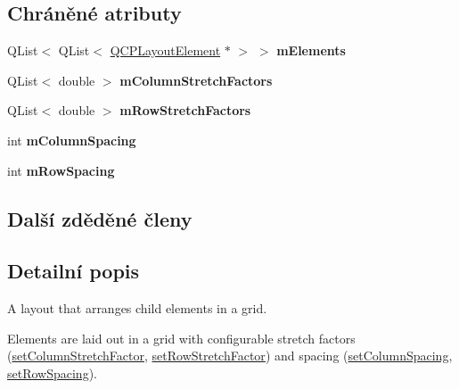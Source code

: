 \subsection*{Chráněné atributy}
\begin{DoxyCompactItemize}
\item 
\hypertarget{classQCPLayoutGrid_a3577d3855bf8ad20ef9079291a49f397}{}Q\+List$<$ Q\+List$<$ \hyperlink{classQCPLayoutElement}{Q\+C\+P\+Layout\+Element} $\ast$ $>$ $>$ {\bfseries m\+Elements}\label{classQCPLayoutGrid_a3577d3855bf8ad20ef9079291a49f397}

\item 
\hypertarget{classQCPLayoutGrid_ac6aabe62339f94f18b9f8adab94b1840}{}Q\+List$<$ double $>$ {\bfseries m\+Column\+Stretch\+Factors}\label{classQCPLayoutGrid_ac6aabe62339f94f18b9f8adab94b1840}

\item 
\hypertarget{classQCPLayoutGrid_a36c85a7eaf342680fb9b8a4977486f16}{}Q\+List$<$ double $>$ {\bfseries m\+Row\+Stretch\+Factors}\label{classQCPLayoutGrid_a36c85a7eaf342680fb9b8a4977486f16}

\item 
\hypertarget{classQCPLayoutGrid_ae9ac48f0791be07ead0a96dbd5622770}{}int {\bfseries m\+Column\+Spacing}\label{classQCPLayoutGrid_ae9ac48f0791be07ead0a96dbd5622770}

\item 
\hypertarget{classQCPLayoutGrid_a8b67f183f4645739cc4c794d75843b40}{}int {\bfseries m\+Row\+Spacing}\label{classQCPLayoutGrid_a8b67f183f4645739cc4c794d75843b40}

\end{DoxyCompactItemize}
\subsection*{Další zděděné členy}


\subsection{Detailní popis}
A layout that arranges child elements in a grid. 

Elements are laid out in a grid with configurable stretch factors (\hyperlink{classQCPLayoutGrid_ae38f31a71687b9d7ee3104852528fb50}{set\+Column\+Stretch\+Factor}, \hyperlink{classQCPLayoutGrid_a7b0273de5369bd93d942edbaf5b166ec}{set\+Row\+Stretch\+Factor}) and spacing (\hyperlink{classQCPLayoutGrid_a3a49272aba32bb0fddc3bb2a45a3dba0}{set\+Column\+Spacing}, \hyperlink{classQCPLayoutGrid_aaef2cd2d456197ee06a208793678e436}{set\+Row\+Spacing}).

